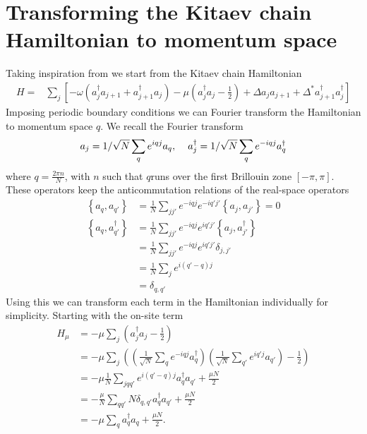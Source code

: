 \section{Transforming the Kitaev chain Hamiltonian to momentum space}    
\label{Appendix:Hamiltonian_Transformation_momentum_space}
Taking inspiration from \cite{aliceaNewDirectionsPursuit2012} we start from the Kitaev chain Hamiltonian 
\begin{align}
    H =& \sum_j\left[ - \omega \left(a_j^\dagger a_{j+1} + a_{j+1}^\dagger a_j  \right) - \mu \left(a_j^\dagger  a_j - \frac{1}{2} \right) + \Delta a_j a_{j+1} + \Delta^* a_{j+1}^\dagger a_j^\dagger \right]
\end{align}
Imposing periodic boundary conditions we can Fourier transform the Hamiltonian to momentum space $q$. We recall the Fourier transform
\begin{align}
    a_j = \frac{1}{\sqrt{N}} \sum_q e^{iqj}a_q, \hspace{4mm} a_j^\dagger = \frac{1}{\sqrt{N}} \sum_q e^{-iqj}a_q^\dagger
\end{align}
where $q = \frac{2 \pi n}{N}$, with $n$ such that $q$runs over the first Brillouin zone $[-\pi, \pi]$. These operators keep the anticommutation relations of the real-space operators 
\begin{align}
    \left\{a_q, a_{q'} \right\} &= \frac{1}{N} \sum_{j j'} e^{-iqj} e^{-iq'j'}\left\{a_j, a_{j'} \right\} = 0\\
    \left\{a_q, a_{q'}^\dagger \right\} &= \frac{1}{N} \sum_{jj'} e^{-iqj} e^{iq'j'}\left\{a_j, a_{j'}^\dagger \right\} \\
    &= \frac{1}{N} \sum_{j j'} e^{-iqj} e^{iq'j'} \delta_{j, j'} \\
    &= \frac{1}{N} \sum_j e^{i(q'-q)j} \\
    &= \delta_{q, q'}
\end{align}
Using this we can transform each term in the Hamiltonian individually for simplicity. Starting with the on-site term
\begin{align}
    H_\mu &= -\mu \sum_j \left(a_j^\dagger a_j - \frac{1}{2} \right) \\
    &=  -\mu \sum_j \left( \left( \frac{1}{\sqrt{N}} \sum_q e^{-iqj}a_q^\dagger \right) \left( \frac{1}{\sqrt{N}} \sum_{q'} e^{iq'j}a_{q'} \right) - \frac{1}{2}\right) \\
    &= -\mu \frac{1}{N} \sum_{j q q'} e^{i(q'-q)j} a_q^\dagger a_{q'} + \frac{\mu N}{2}\\
    &= -\frac{\mu}{N} \sum_{qq'} N \delta_{q,q'} a_q^\dagger a_{q'} + \frac{\mu N}{2}\\
    &= -\mu \sum_q  a_q^\dagger a_q + \frac{\mu N}{2}.
\end{align}
